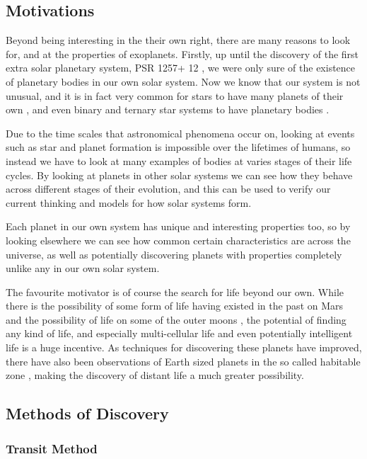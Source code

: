 \subsection{Motivations}

Beyond being interesting in the their own right, there are many reasons to look for, and at the properties of exoplanets. Firstly, up until the discovery of the first extra solar planetary system, PSR 1257+ 12 \citep{wolszczan1992planetary}, we were only sure of the existence of planetary bodies in our own solar system. Now we know that our system is not unusual, and it is in fact very common for stars to have many planets of their own \citep{mcarthur2004detection}, and even binary and ternary star systems to have planetary bodies \citep{marcy2002planet}.

Due to the time scales that astronomical phenomena occur on, looking at events such as star and planet formation is impossible over the lifetimes of humans, so instead we have to look at many examples of bodies at varies stages of their life cycles. By looking at planets in other solar systems we can see how they behave across different stages of their evolution, and this can be used to verify our current thinking and models for how solar systems form.

Each planet in our own system has unique and interesting properties too, so by looking elsewhere we can see how common certain characteristics are across the universe, as well as potentially discovering planets with properties completely unlike any in our own solar system.

The favourite motivator is of course the search for life beyond our own. While there is the possibility of some form of life having existed in the past on Mars \citep{mckay1996search} and the possibility of life on some of the outer moons \citep{mckay2005possibilities}, the potential of finding any kind of life, and especially multi-cellular life and even potentially intelligent life is a huge incentive. As techniques for discovering these planets have improved, there have also been observations of Earth sized planets in the so called habitable zone \citep{wordsworth2011gliese}, making the discovery of distant life a much greater possibility.

\subsection{Methods of Discovery}

\subsubsection{Transit Method}

